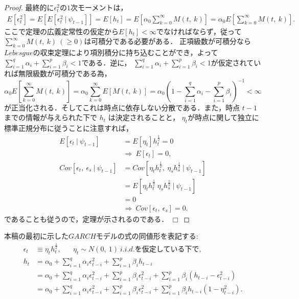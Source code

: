 \documentclass[8pt]{jsarticle}
\newtheorem{proof}{証明}
\def\qed{\hfill $\Box$}
\begin{document}
\begin{proof}
最終的に$\epsilon_t^2$の$1$次モーメントは，
\begin{align*}
	E[\epsilon_t^2] = E\left[ E[\epsilon_t^2\ |\ \psi_{t-1}] \right] = E[h_t]
	= E\left[ \alpha_0 \sum_{k=0}^{\infty} M(t,\ k) \right]
	= \alpha_0 E\left[ \sum_{k=0}^{\infty} M(t,\ k) \right].
\end{align*}
ここで定理の広義定常性の仮定から$E[h_t] < \infty$でなければならず，従って$\sum_{k=0}^{\infty} M(t,\ k)\ (\geq 0)$は可積分である必要がある．
正項級数が可積分なら$Lebesgue$の収束定理により項別積分に持ち込むことができ，よって$\sum_{i=1}^{q} \alpha_i + \sum_{i=1}^{p} \beta_i < 1$である．逆に，
$\sum_{i=1}^{q} \alpha_i + \sum_{i=1}^{p} \beta_i < 1$が仮定されていれば無限級数が可積分である為，
\[
	\alpha_0 E\left[ \sum_{k=0}^{\infty} M(t,\ k) \right] = \alpha_0 \sum_{k=0}^{\infty} E\left[ M(t,\ k) \right] = \alpha_0 \left( 1 - \sum_{i=1}^{q} \alpha_i - \sum_{i=1}^{p} \beta_i \right)^{-1} < \infty
\]
が正当化される．そしてこれは時点に依存しない分散である．また，時点 $t-1$ までの情報が与えられた下で $h_t$ は決定されることと，
$\eta_t$が時点に関して独立に標準正規分布に従うことに注意すれば，
\begin{align*}
	E[\epsilon_t\ |\ \psi_{t-1}] &= E[\eta_t]h_t^\frac{1}{2} = 0\ \\
	&\Rightarrow\ E[\epsilon_t] = 0, \\
	Cov[\epsilon_t,\ \epsilon_s\ |\ \psi_{t-1}] &= Cov[\eta_t h_t^\frac{1}{2},\ \eta_s h_s^\frac{1}{2}\ |\ \psi_{t-1}] \\
	&= E[\eta_t h_t^\frac{1}{2}\ \eta_s h_s^\frac{1}{2}\ |\ \psi_{t-1}] \\
	&= 0 \\
	&\Rightarrow\ Cov[\epsilon_t,\ \epsilon_s] = 0.
\end{align*}
であることも従うので，定理が示されるのである．
\qed
\end{proof}

本稿の最初に示した$GARCH$モデルの式の同値形を表記する:
\begin{align*}
	\epsilon_t &\equiv \eta_t h_t^{\frac{1}{2}}, \hspace{20pt} \eta_t \sim N(0,\ 1)\ i.i.d. \mbox{を仮定している下で,}\\
	h_t &= \alpha_0 + \sum_{i=1}^{q} \alpha_i \epsilon_{t-i}^2 + \sum_{i=1}^{p} \beta_i h_{t-i} \\
	&= \alpha_0 + \sum_{i=1}^{q} \alpha_i \epsilon_{t-i}^2 + \sum_{i=1}^{p} \beta_i \epsilon_{t-i}^2 + \sum_{i=1}^{p} \beta_i (h_{t-i} - \epsilon_{t-i}^2) \\
	&= \alpha_0 + \sum_{i=1}^{q} \alpha_i \epsilon_{t-i}^2 + \sum_{i=1}^{p} \beta_i \epsilon_{t-i}^2 + \sum_{i=1}^{p} \beta_i h_{t-i}(1 - \eta_{t-i}^2).
\end{align*}
\end{document}
